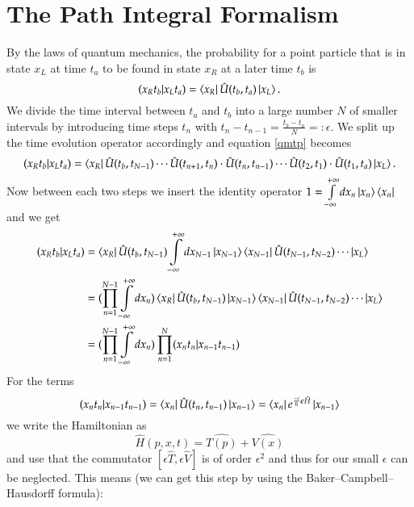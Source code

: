 \section{The Path Integral Formalism}

By the laws of quantum mechanics, the probability for a point particle that is in state $x_L$ at time $t_a$ to be found in state $x_R$ at a later time $t_b$ is
\begin{equation} \label{qmtp}
  (x_R t_b | x_L t_a) = \bra{x_R}\hat{U}(t_b,t_a)\ket{x_L}.
\end{equation}
We divide the time interval between $t_a$ and $t_b$ into a large number $N$ of smaller intervals by introducing time steps $t_n$ with $t_n -t_{n-1} = \frac{t_b - t_a}{N} =:\epsilon$. We split up the time evolution operator accordingly and equation \ref{qmtp} becomes
\begin{equation} \label{qmtpn}
  (x_R t_b | x_L t_a) = \bra{x_R}\hat{U}(t_b,t_{N-1}) \cdots \hat{U}(t_{n+1},t_n)\cdot\hat{U}(t_n,t_{n-1}) \cdots \hat{U}(t_2,t_1)\cdot\hat{U}(t_1,t_a)\ket{x_L}.
\end{equation}
Now between each two steps we insert the identity operator $1 = \int\limits_{-\infty}^{+\infty} dx_n \ket{x_n}\bra{x_n}$ and we get 
\begin{align}
  (x_R t_b | x_L t_a) &=  \bra{x_R}\hat{U}(t_b,t_{N-1}) \int\limits_{-\infty}^{+\infty} dx_{N-1} \ket{x_{N-1}}\bra{x_{N-1}} \hat{U}(t_{N-1},t_{N-2}) \cdots \ket{x_L} \\
                      &=  (\prod_{n=1}^{N-1} \int\limits_{-\infty}^{+\infty} dx_{n}) \bra{x_R}\hat{U}(t_b,t_{N-1})  \ket{x_{N-1}}\bra{x_{N-1}} \hat{U}(t_{N-1},t_{N-2}) \cdots \ket{x_L} \\
                      &=  (\prod_{n=1}^{N-1} \int\limits_{-\infty}^{+\infty} dx_{n})\prod_{n=1}^{N} (x_n t_n | x_{n-1} t_{n-1}) \label{tpi}
\end{align}
For the terms 
\begin{equation}\label{tpn}
  (x_n t_n | x_{n-1} t_{n-1}) = \bra{x_n} \hat{U}(t_{n},t_{n-1}) \ket{x_{n-1}} = \bra{x_n} e^{\frac{-i}{\hbar} \epsilon \hat{H}} \ket{x_{n-1}} 
\end{equation}
we write the Hamiltonian as
\begin{equation}\label{HTV}
  \hat{H}(p,x,t) = \hat{T(p)} + \hat{V(x)}
\end{equation}
and use that the commutator $[\epsilon \hat{T}, \epsilon \hat{V}]$ is of order $\epsilon^2$ and thus for our small $\epsilon$ can be neglected. This means (we can get this step by using the Baker–Campbell–Hausdorff formula):
